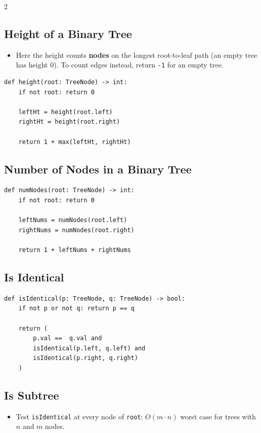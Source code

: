 \documentclass[9pt,a4paper]{extarticle}
\begin{document}
\begin{multicols}{2}
\subsection{Height of a Binary Tree}

\begin{itemize}
\item Here the height counts \textbf{nodes} on the longest root-to-leaf path (an empty tree has height 0). To count edges instead, return \texttt{-1} for an empty tree.
\end{itemize}

\begin{lstlisting}
def height(root: TreeNode) -> int:
    if not root: return 0

    leftHt = height(root.left)
    rightHt = height(root.right)

    return 1 + max(leftHt, rightHt)
\end{lstlisting}

\subsection{Number of Nodes in a Binary Tree}

\begin{lstlisting}
def numNodes(root: TreeNode) -> int:
    if not root: return 0

    leftNums = numNodes(root.left)
    rightNums = numNodes(root.right)

    return 1 + leftNums + rightNums
\end{lstlisting}

\subsection{Is Identical}

\begin{lstlisting}
def isIdentical(p: TreeNode, q: TreeNode) -> bool:
    if not p or not q: return p == q

    return (
        p.val ==  q.val and
        isIdentical(p.left, q.left) and
        isIdentical(p.right, q.right)
    )
\end{lstlisting}

\subsection{Is Subtree}

\begin{itemize}
\item Test \texttt{isIdentical} at every node of \texttt{root}: $O(m \cdot n)$ worst case for trees with $n$ and $m$ nodes.
\end{itemize}


\end{multicols}
\end{document}
